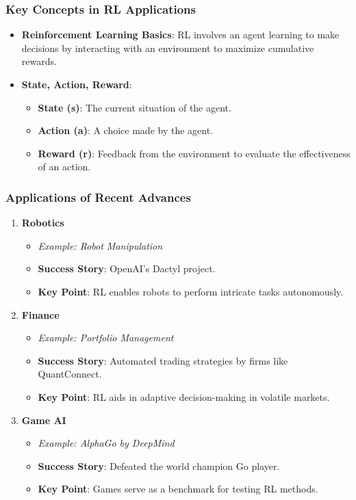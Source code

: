 \documentclass[aspectratio=169]{beamer}
\begin{document}
\begin{frame}[fragile]
    \frametitle{Key Concepts in RL Applications}
    \begin{itemize}
        \item \textbf{Reinforcement Learning Basics}: 
            RL involves an agent learning to make decisions by interacting with an environment to maximize cumulative rewards.
        \item \textbf{State, Action, Reward}:
            \begin{itemize}
                \item \textbf{State (s)}: The current situation of the agent.
                \item \textbf{Action (a)}: A choice made by the agent.
                \item \textbf{Reward (r)}: Feedback from the environment to evaluate the effectiveness of an action.
            \end{itemize}
    \end{itemize}
\end{frame}

\begin{frame}[fragile]
    \frametitle{Applications of Recent Advances}
    \begin{enumerate}
        \item \textbf{Robotics}
            \begin{itemize}
                \item \textit{Example: Robot Manipulation}
                \item \textbf{Success Story}: OpenAI's Dactyl project.
                \item \textbf{Key Point}: RL enables robots to perform intricate tasks autonomously.
            \end{itemize}
        \item \textbf{Finance}
            \begin{itemize}
                \item \textit{Example: Portfolio Management}
                \item \textbf{Success Story}: Automated trading strategies by firms like QuantConnect.
                \item \textbf{Key Point}: RL aids in adaptive decision-making in volatile markets.
            \end{itemize}
        \item \textbf{Game AI}
            \begin{itemize}
                \item \textit{Example: AlphaGo by DeepMind}
                \item \textbf{Success Story}: Defeated the world champion Go player.
                \item \textbf{Key Point}: Games serve as a benchmark for testing RL methods.
            \end{itemize}
    \end{enumerate}
\end{frame}
\end{document}
